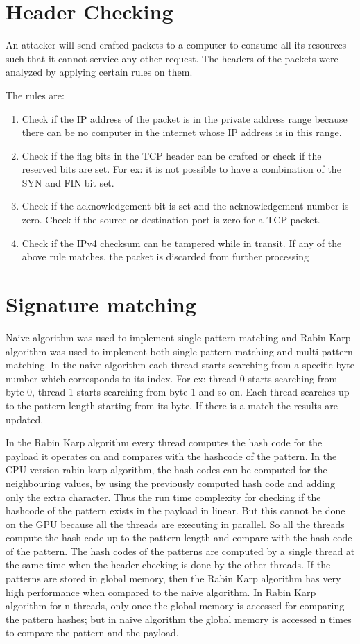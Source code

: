 \section{Header Checking}
An attacker will send crafted packets to a computer to consume all its resources such that it cannot service any other request. The headers of the packets were analyzed by applying certain rules on them. 

The rules are:
\begin{enumerate}
	\item
	Check if the IP address of the packet is in the private address range because there can be no computer in the internet whose IP address is in this range.
	\item
	Check if the flag bits in the TCP header can be crafted or check if the reserved bits are set. For ex: it is not possible to have a combination of the SYN and FIN bit set.
	\item
	Check if the acknowledgement bit is set and the acknowledgement number is zero. Check if the source or destination port is zero for a TCP packet.
	\item
	Check if the IPv4 checksum can be tampered while in transit.
	If any of the above rule matches, the packet is discarded from further processing
\end{enumerate}

\section{Signature matching}
Naive algorithm was used to implement single pattern matching and Rabin Karp algorithm was used to implement both single pattern matching and multi-pattern matching. In the naive algorithm each thread starts searching from a specific byte number which corresponds to its index. For ex: thread 0 starts searching from byte 0, thread 1 starts searching from byte 1 and so on. Each thread searches up to the pattern length starting from its byte. If there is a match the results are updated.

In the Rabin Karp algorithm every thread computes the hash code for the payload it operates on and compares with the hashcode of the pattern. In the CPU version rabin karp algorithm, the hash codes can be computed for the neighbouring values, by using the previously computed hash code and adding only the extra character. Thus the run time complexity for checking if the hashcode of the pattern exists in the payload in linear. But this cannot be done on the GPU because all the threads are executing in parallel. So all the threads compute the hash code up to the pattern length and compare with the hash code of the pattern. The hash codes of the patterns are computed by a single thread at the same time when the header checking is done by the other threads. If the patterns are stored in global memory, then the Rabin Karp algorithm has very high performance when compared to the naive algorithm. In Rabin Karp algorithm for n threads, only once the global memory is accessed for comparing the pattern hashes; but in naive algorithm the global memory is accessed n times to compare the pattern and the payload.


